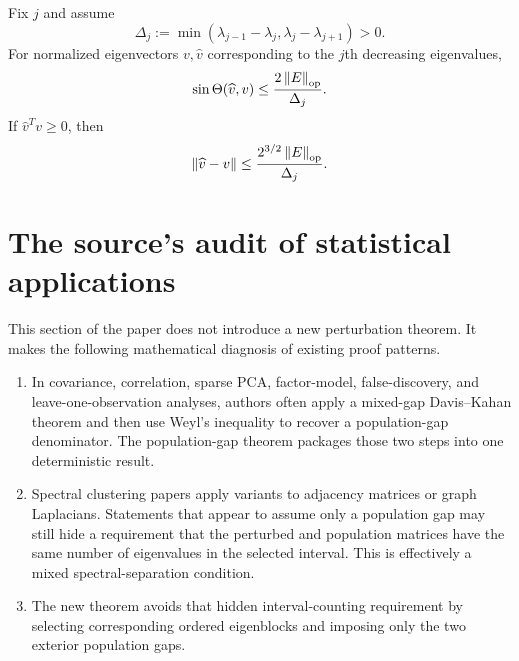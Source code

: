 \begin{corollary}
Fix $j$ and assume
\[
  \Delta_j:=\min(\lambda_{j-1}-\lambda_j,
                  \lambda_j-\lambda_{j+1})>0.
\]
For normalized eigenvectors $v,\widehat v$ corresponding to the $j$th decreasing eigenvalues,
\[
  \sin\Theta(\widehat v,v)
  \le
  \frac{2\left\lVert E\right\rVert_{\mathrm{op}}}{\Delta_j}.
\]
If $\widehat v^Tv\ge0$, then
\[
  \left\lVert \widehat v-v\right\rVert
  \le
  \frac{2^{3/2}\left\lVert E\right\rVert_{\mathrm{op}}}{\Delta_j}.
\]
\end{corollary}


\section{The source's audit of statistical applications}

This section of the paper does not introduce a new perturbation theorem. It makes the following mathematical diagnosis of existing proof patterns.

\begin{enumerate}[leftmargin=2em]
\item In covariance, correlation, sparse PCA, factor-model, false-discovery, and leave-one-observation analyses, authors often apply a mixed-gap Davis--Kahan theorem and then use Weyl's inequality to recover a population-gap denominator. The population-gap theorem packages those two steps into one deterministic result.
\item Spectral clustering papers apply variants to adjacency matrices or graph Laplacians. Statements that appear to assume only a population gap may still hide a requirement that the perturbed and population matrices have the same number of eigenvalues in the selected interval. This is effectively a mixed spectral-separation condition.
\item The new theorem avoids that hidden interval-counting requirement by selecting corresponding ordered eigenblocks and imposing only the two exterior population gaps.
\end{enumerate}

